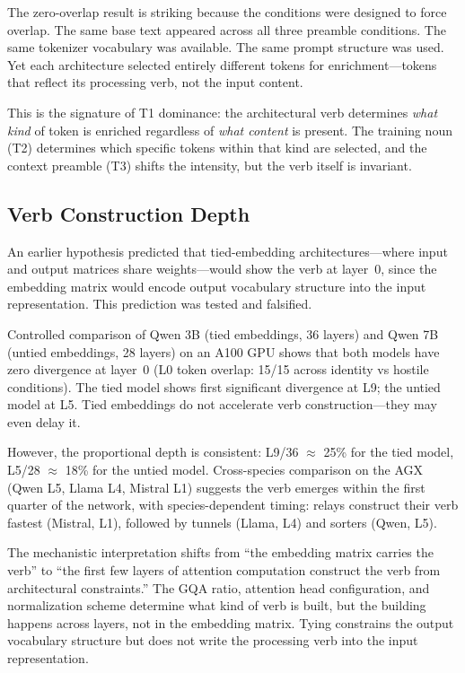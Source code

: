 \documentclass[12pt]{article}
\begin{document}
The zero-overlap result is striking because the conditions were designed to force overlap. The same base text appeared across all three preamble conditions. The same tokenizer vocabulary was available. The same prompt structure was used. Yet each architecture selected entirely different tokens for enrichment---tokens that reflect its processing verb, not the input content.

This is the signature of T1 dominance: the architectural verb determines \emph{what kind} of token is enriched regardless of \emph{what content} is present. The training noun (T2) determines which specific tokens within that kind are selected, and the context preamble (T3) shifts the intensity, but the verb itself is invariant.

\subsection{Verb Construction Depth}

An earlier hypothesis predicted that tied-embedding architectures---where input and output matrices share weights---would show the verb at layer~0, since the embedding matrix would encode output vocabulary structure into the input representation. This prediction was tested and falsified.

Controlled comparison of Qwen 3B (tied embeddings, 36 layers) and Qwen 7B (untied embeddings, 28 layers) on an A100 GPU shows that both models have zero divergence at layer~0 (L0 token overlap: 15/15 across identity vs hostile conditions). The tied model shows first significant divergence at L9; the untied model at L5. Tied embeddings do not accelerate verb construction---they may even delay it.

However, the proportional depth is consistent: L9/36 $\approx$ 25\% for the tied model, L5/28 $\approx$ 18\% for the untied model. Cross-species comparison on the AGX (Qwen L5, Llama L4, Mistral L1) suggests the verb emerges within the first quarter of the network, with species-dependent timing: relays construct their verb fastest (Mistral, L1), followed by tunnels (Llama, L4) and sorters (Qwen, L5).

The mechanistic interpretation shifts from ``the embedding matrix carries the verb'' to ``the first few layers of attention computation construct the verb from architectural constraints.'' The GQA ratio, attention head configuration, and normalization scheme determine what kind of verb is built, but the building happens across layers, not in the embedding matrix. Tying constrains the output vocabulary structure but does not write the processing verb into the input representation.
\end{document}
